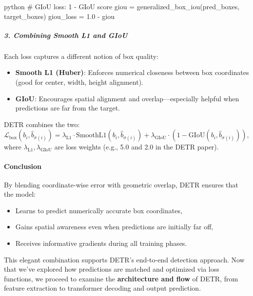 \begin{enrichment}
\begin{enrichment}
\begin{mintedbox}[bgcolor=black!3, fontsize=\small, linenos]{python}
		 	# GIoU loss: 1 - GIoU score
		 	giou = generalized_box_iou(pred_boxes, target_boxes)
		 	giou_loss = 1.0 - giou
		 \end{mintedbox}
		 
		 \subparagraph{3. Combining Smooth L1 and GIoU}
		 
		 Each loss captures a different notion of box quality:
		 
		 \begin{itemize}
		 	\item \textbf{Smooth L1 (Huber)}: Enforces numerical closeness between box coordinates (good for center, width, height alignment).
		 	\item \textbf{GIoU}: Encourages spatial alignment and overlap—especially helpful when predictions are far from the target.
		 \end{itemize}
		 
		 DETR combines the two:
		 \[
		 \mathcal{L}_\text{box}(b_i, \hat{b}_{\sigma(i)}) = 
		 \lambda_\text{L1} \cdot \text{SmoothL1}(b_i, \hat{b}_{\sigma(i)}) +
		 \lambda_\text{GIoU} \cdot \left(1 - \text{GIoU}(b_i, \hat{b}_{\sigma(i)})\right),
		 \]
		 where \( \lambda_\text{L1}, \lambda_\text{GIoU} \) are loss weights (e.g., 5.0 and 2.0 in the DETR paper).
		 
		 \paragraph{Conclusion}
		 
		 By blending coordinate-wise error with geometric overlap, DETR ensures that the model:
		 \begin{itemize}
		 	\item Learns to predict numerically accurate box coordinates,
		 	\item Gains spatial awareness even when predictions are initially far off,
		 	\item Receives informative gradients during all training phases.
		 \end{itemize}
		 
		 This elegant combination supports DETR’s end-to-end detection approach. Now that we’ve explored how predictions are matched and optimized via loss functions, we proceed to examine the \textbf{architecture and flow} of DETR, from feature extraction to transformer decoding and output prediction.
		 
	\end{enrichment}
	
	\begin{enrichment}
		\label{enr:chapter14_detr_architecture}
		

\end{enrichment}
\end{enrichment}
